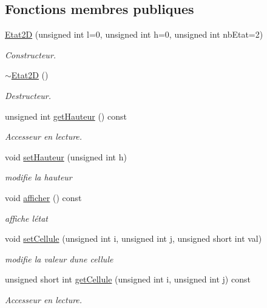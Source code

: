 \subsection*{Fonctions membres publiques}
\begin{DoxyCompactItemize}
\item 
\hyperlink{class_etat2_d_aae67a6ba3b3b3726a9533f647d34dd55}{Etat2D} (unsigned int l=0, unsigned int h=0, unsigned int nb\+Etat=2)
\begin{DoxyCompactList}\small\item\em Constructeur. \end{DoxyCompactList}\item 
\hyperlink{class_etat2_d_a3eaa7f0e606a9b2f5fc634d6b571042e}{$\sim$\+Etat2D} ()
\begin{DoxyCompactList}\small\item\em Destructeur. \end{DoxyCompactList}\item 
unsigned int \hyperlink{class_etat2_d_aff82bb61adbe51f2702e34f0ea34a55d}{get\+Hauteur} () const 
\begin{DoxyCompactList}\small\item\em Accesseur en lecture. \end{DoxyCompactList}\item 
void \hyperlink{class_etat2_d_a97b757ecf3f703f5e418c00e250c074c}{set\+Hauteur} (unsigned int h)
\begin{DoxyCompactList}\small\item\em modifie la hauteur \end{DoxyCompactList}\item 
void \hyperlink{class_etat2_d_a6fa30b43d2971b01cbfb59aef094aded}{afficher} () const 
\begin{DoxyCompactList}\small\item\em affiche l\textquotesingle{}état \end{DoxyCompactList}\item 
void \hyperlink{class_etat2_d_a96f855c00941ce59b2c84d347dfb5e1c}{set\+Cellule} (unsigned int i, unsigned int j, unsigned short int val)
\begin{DoxyCompactList}\small\item\em modifie la valeur d\textquotesingle{}une cellule \end{DoxyCompactList}\item 
unsigned short int \hyperlink{class_etat2_d_adfe7448075788e3cd17c0b7df50b9438}{get\+Cellule} (unsigned int i, unsigned int j) const 
\begin{DoxyCompactList}\small\item\em Accesseur en lecture. \end{DoxyCompactList}\item 

\end{DoxyCompactItemize}
